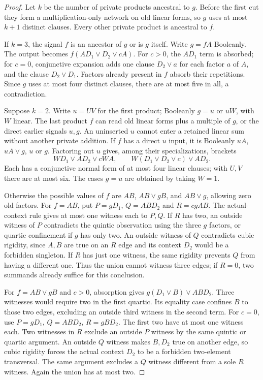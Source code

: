 \documentclass[11pt]{article}
\theoremstyle{definition}
\theoremstyle{remark}
\begin{document}
\begin{proof}
Let $k$ be the number of private products ancestral to $g$. Before the first cut they form a multiplication-only network on old linear forms, so $g$ uses at most $k+1$ distinct clauses. Every other private product is ancestral to $f$.

If $k=3$, the signal $f$ is an ancestor of $g$ or is $g$ itself. Write $g=fA$ Booleanly. The output becomes $f(AD_1\vee D_2\vee cA)$. For $c>0$, the $AD_1$ term is absorbed; for $c=0$, conjunctive expansion adds one clause $D_2\vee a$ for each factor $a$ of $A$, and the clause $D_2\vee D_1$. Factors already present in $f$ absorb their repetitions. Since $g$ uses at most four distinct clauses, there are at most five in all, a contradiction.

Suppose $k=2$. Write $u=UV$ for the first product; Booleanly $g=u$ or $uW$, with $W$ linear. The last product $f$ can read old linear forms plus a multiple of $g$, or the direct earlier signals $u,g$. An uninserted $u$ cannot enter a retained linear sum without another private addition. If $f$ has a direct $u$ input, it is Booleanly $uA$, $uA\vee g$, $u$ or $g$. Factoring out $u$ gives, among their specializations, brackets
\[
 WD_1\vee AD_2\vee cWA,
 \qquad W(D_1\vee D_2\vee c)\vee AD_2.
\]
Each has a conjunctive normal form of at most four linear clauses; with $U,V$ there are at most six. The cases $g=u$ are obtained by taking $W=1$.

Otherwise the possible values of $f$ are $AB$, $AB\vee gB$, and $AB\vee g$, allowing zero old factors. For $f=AB$, put $P=gD_1$, $Q=ABD_2$ and $R=cgAB$. The actual-context rule gives at most one witness each to $P,Q$. If $R$ has two, an outside witness of $P$ contradicts the quintic observation using the three $g$ factors, or quartic confinement if $g$ has only two. An outside witness of $Q$ contradicts cubic rigidity, since $A,B$ are true on an $R$ edge and its context $D_2$ would be a forbidden singleton. If $R$ has just one witness, the same rigidity prevents $Q$ from having a different one. Thus the union cannot witness three edges; if $R=0$, two summands already suffice for this conclusion.

For $f=AB\vee gB$ and $c>0$, absorption gives $g(D_1\vee B)\vee ABD_2$. Three witnesses would require two in the first quartic. Its equality case confines $B$ to those two edges, excluding an outside third witness in the second term. For $c=0$, use $P=gD_1$, $Q=ABD_2$, $R=gBD_2$. The first two have at most one witness each. Two witnesses in $R$ exclude an outside $P$ witness by the same quintic or quartic argument. An outside $Q$ witness makes $B,D_2$ true on another edge, so cubic rigidity forces the actual context $D_2$ to be a forbidden two-element transversal. The same argument excludes a $Q$ witness different from a sole $R$ witness. Again the union has at most two.


\end{proof}
\end{document}
